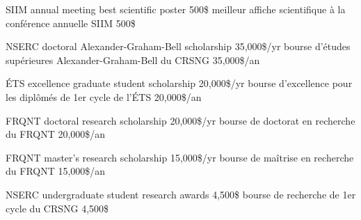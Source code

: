 \documentclass[print]{friggeri-cv}
\begin{document}

\begin{entrylist}
  \engfr
  { {{\small SIIM} annual meeting best scientific poster} {500\$} {\vspace{-3mm}}}
  { {meilleur affiche scientifique à la conférence annuelle {\small SIIM}} {500\$} {\vspace{-3mm}}}

  \engfr
  { {{\small NSERC} doctoral Alexander-Graham-Bell scholarship} {35,000\$/yr} {\vspace{-3mm}}}
  { {bourse d’études supérieures Alexander-Graham-Bell du {\small CRSNG}} {35,000\$/an} {\vspace{-3mm}}}

  \engfr
  { {{\small ÉTS} excellence graduate student scholarship} {20,000\$/yr} {\vspace{-3mm}}}
  { {bourse d'excellence pour les diplômés de 1er cycle de l'ÉTS} {20,000\$/an} {\vspace{-3mm}}}

  \engfr
  { {{\small FRQNT} doctoral research scholarship} {20,000\$/yr} {\vspace{-3mm}}}
  { {bourse de doctorat en recherche du {\small FRQNT}} {20,000\$/an} {\vspace{-3mm}}}

  \engfr
  { {{\small FRQNT} master's research scholarship} {15,000\$/yr} {\vspace{-3mm}}}
  { {bourse de maîtrise en recherche du {\small FRQNT}} {15,000\$/an} {\vspace{-3mm}}}

  \engfr
  { {{\small NSERC} undergraduate student research awards} {4,500\$} {\vspace{-3mm}}}
  { {bourse de recherche de 1er cycle du {\small CRSNG}} {4,500\$} {\vspace{-3mm}}}
\end{entrylist}
\end{document}
